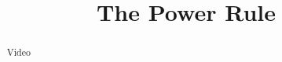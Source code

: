 \documentclass[handout]{ximera}
\title{The Power Rule}
\begin{document}
\begin{abstract} Video %
\end{abstract}

\maketitle

\end{document}
